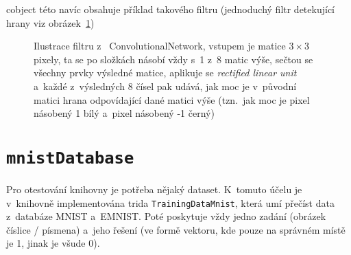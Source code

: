 \documentclass[12pt]{report}			%
\begin{document}
					\Gls{cobject} této  navíc obsahuje příklad takového filtru (jednoduchý filtr detekující hrany viz obrázek~\ref{fig:filter})
					\begin{figure}
						\caption{Ilustrace filtru z~ ConvolutionalNetwork, vstupem je matice $3\times 3$ pixely, ta se po složkách násobí vždy s~1 z~8 matic výše, sečtou se všechny prvky výsledné matice, aplikuje se \emph{rectified linear unit} a~každé z~výsledných 8 čísel pak udává, jak moc je v~původní matici hrana odpovídající dané matici výše (tzn.~jak moc je pixel násobený 1 bílý a~pixel násobený -1 černý)}
						\label{fig:filter}
					\end{figure}
			
			\section{\texttt{mnistDatabase}} \label{sec:md}
				Pro otestování knihovny je potřeba nějaký dataset. K~tomuto účelu je v~knihovně implementována \gls{trida} \verb!TrainingDataMnist!, která umí přečíst data z~databáze MNIST a~EMNIST. Poté poskytuje vždy jedno zadání (obrázek číslice / písmena) a~jeho řešení (ve formě vektoru, kde pouze na správném místě je 1, jinak je všude 0).
				
\end{document}
